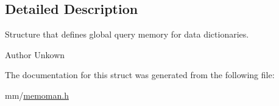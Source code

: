 \subsection{Detailed Description}
Structure that defines global query memory for data dictionaries. 

\begin{DoxyAuthor}{Author}
Unkown 
\end{DoxyAuthor}


The documentation for this struct was generated from the following file\+:\begin{DoxyCompactItemize}
\item 
mm/\hyperlink{memoman_8h}{memoman.\+h}\end{DoxyCompactItemize}

